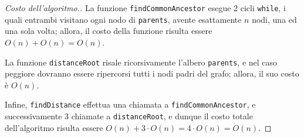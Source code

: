 \documentclass[a4paper, 12pt]{report}
\begin{document}
    \begin{proof}[Costo dell'algoritmo.]
        La funzione \texttt{findCommonAncestor} esegue 2 cicli \texttt{while}, i quali entrambi visitano ogni nodo di \texttt{parents}, avente esattamente $n$ nodi, una ed una sola volta; allora, il costo della funzione risulta essere $O(n) + O(n) = O(n)$.

        La funzione \texttt{distanceRoot} risale ricorsivamente l'albero \texttt{parents}, e nel caso peggiore dovranno essere ripercorsi tutti i nodi padri del grafo; allora, il suo costo è $O(n)$.

        Infine, \texttt{findDistance} effettua una chiamata a \texttt{findCommonAncestor}, e successivamente 3 chiamate a \texttt{distanceRoot}, e dunque il costo totale dell'algoritmo risulta essere $O(n) + 3 \cdot O(n) = 4 \cdot O(n) = O(n)$.
    \end{proof}
\end{document}

